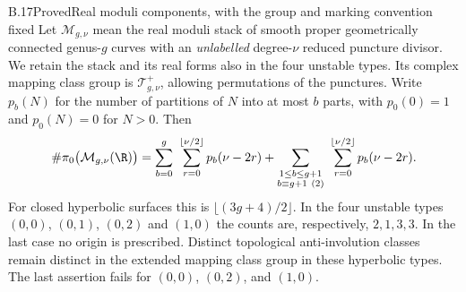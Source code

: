\begin{claim}{B.17}{Proved}{Real moduli components, with the group and marking convention fixed}
Let $\mathcal M_{g,\nu}$ mean the real moduli stack of smooth proper
geometrically connected genus-$g$ curves with an \emph{unlabelled}
degree-$\nu$ reduced puncture divisor. We retain the stack and its
real forms also in the four unstable types. Its complex
mapping class group is $\mathcal T^+_{g,\nu}$, allowing permutations of the
punctures. Write $p_b(N)$ for the number of partitions of $N$ into at most
$b$ parts, with $p_0(0)=1$ and $p_0(N)=0$ for $N>0$. Then
\[
 \#\pi_0\bigl(\mathcal M_{g,\nu}(\R)\bigr)
 =\sum_{b=0}^{g}\ \sum_{r=0}^{\lfloor\nu/2\rfloor}p_b(\nu-2r)
  +\sum_{\substack{1\le b\le g+1\\ b\equiv g+1\ (2)}}
       \ \sum_{r=0}^{\lfloor\nu/2\rfloor}p_b(\nu-2r).
\]
For closed hyperbolic surfaces this is $\lfloor(3g+4)/2\rfloor$.
In the four unstable types $(0,0)$, $(0,1)$, $(0,2)$ and $(1,0)$ the counts are,
respectively, $2,1,3,3$. In the last case no origin is prescribed.
Distinct topological anti-involution classes remain distinct in the extended
mapping class group in these hyperbolic types. The last assertion fails for
$(0,0)$, $(0,2)$, and $(1,0)$.
\end{claim}
